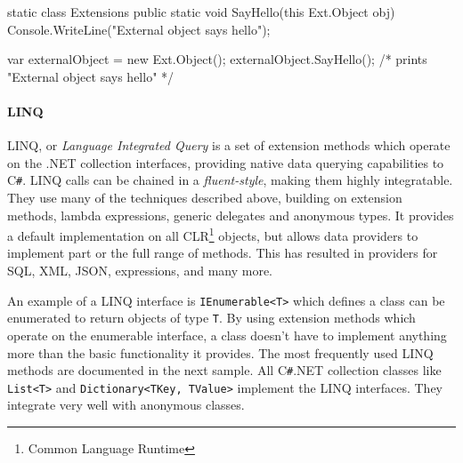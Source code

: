 \documentclass[twoside,openright]{uva-bachelor-thesis}
\newcommand{\code}[1]{\texttt{\footnotesize#1}}
\newcommand{\cs}{C\texttt{\#}\xspace}
\begin{document}
			\begin{codespan}
				\begin{csharpcode}
					static class Extensions
					{
						public static void SayHello(this Ext.Object obj)
						{
							Console.WriteLine("External object says hello");
						}
					}
					
					var externalObject = new Ext.Object();
					externalObject.SayHello();    /* prints "External object says hello" */
										
				\end{csharpcode}
			\end{codespan}
			
		\paragraph{LINQ}
			LINQ, or \emph{Language Integrated Query} is a set of extension methods which operate on the .NET collection interfaces, providing native data querying capabilities to \cs\cite{website:msdn-reflection}. LINQ calls can be chained in a \emph{fluent-style}, making them highly integratable. They use many of the techniques described above, building on extension methods, lambda expressions, generic delegates and anonymous types. It provides a default implementation on all CLR\footnote{Common Language Runtime} objects, but allows data providers to implement part or the full range of methods. This has resulted in providers for SQL, XML, JSON, expressions, and many more.
			
			An example of a LINQ interface is \code{IEnumerable<T>} which defines a class can be enumerated to return objects of type \code{T}. By using extension methods which operate on the enumerable interface, a class doesn't have to implement anything more than the basic functionality it provides. The most frequently used LINQ methods are documented in the next sample. All \cs .NET collection classes like \code{List<T>} and \code{Dictionary<TKey, TValue>} implement the LINQ interfaces. They integrate very well with anonymous classes.
			
\end{document}
